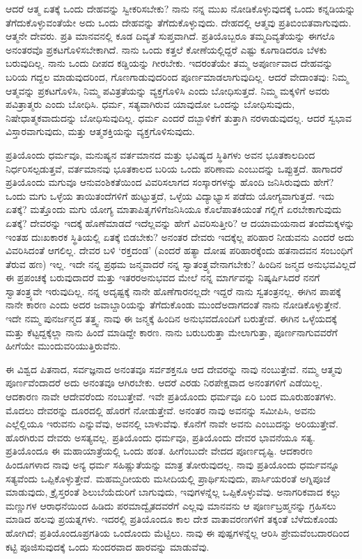 ಆದರೆ ಆತ್ಮ ಏತಕ್ಕೆ ಒಂದು ದೇಹವನ್ನು ಸ್ವೀಕರಿಸಬೇಕು? ನಾನು ನನ್ನ ಮುಖ ನೋಡಿಕೊಳ್ಳುವುದಕ್ಕೆ ಒಂದು ಕನ್ನಡಿಯನ್ನು ತೆಗೆದುಕೊಳ್ಳುವಂತೆಯೇ ಅದು ಒಂದು ದೇಹವನ್ನು ತೆಗೆದುಕೊಳ್ಳುವುದು. ದೇಹದಲ್ಲಿ ಆತ್ಮವು ಪ್ರತಿಬಿಂಬಿತವಾಗುವುದು. ಆತ್ಮನೇ ದೇವರು. ಪ್ರತಿ ಮಾನವನಲ್ಲಿ ಕೂಡ ದಿವ್ಯತೆ ಸುಪ್ತವಾಗಿದೆ. ಪ್ರತಿಯೊಬ್ಬರೂ ತಮ್ಮ\break ದಿವ್ಯತೆಯನ್ನು ಈಗಲೊ ಅನಂತರವೊ ಪ್ರಕಟಗೊಳಿಸಬೇಕಾಗಿದೆ. ನಾನು ಒಂದು ಕತ್ತಲೆ ಕೋಣೆಯಲ್ಲಿದ್ದರೆ ಎಷ್ಟು ಕೂಗಾಡಿದರೂ ಬೆಳಕು ಬರುವುದಿಲ್ಲ. ನಾನು ಒಂದು ದೀಪದ ಕಡ್ಡಿಯನ್ನು ಗೀರಬೇಕು. ಇದರಂತೆಯೇ ತಮ್ಮ ಅಪೂರ್ಣವಾದ ದೇಹವನ್ನು ಬರಿಯ ಗದ್ದಲ ಮಾಡುವುದರಿಂದ, ಗೊಣಗಾಡುವುದರಿಂದ ಪೂರ್ಣಮಾಡಲಾಗುವುದಿಲ್ಲ. ಆದರೆ ವೇದಾಂತವು: ನಿಮ್ಮ ಆತ್ಮವನ್ನು ಪ್ರಕಟಗೊಳಿಸಿ, ನಿಮ್ಮ ಪವಿತ್ರತೆಯನ್ನು ವ್ಯಕ್ತಗೊಳಿಸಿ ಎಂದು ಬೋಧಿಸುತ್ತದೆ. ನಿಮ್ಮ ಮಕ್ಕಳಿಗೆ ಅವರು ಪವಿತ್ರಾತ್ಮರು ಎಂದು ಬೋಧಿಸಿ. ಧರ್ಮ, ಸತ್ಯವಾಗಿರುವ ಯಾವುದೋ ಒಂದನ್ನು ಬೋಧಿಸುವುದು, ನಿಷೇಧಾತ್ಮಕವಾದುದನ್ನು ಬೋಧಿಸುವುದಿಲ್ಲ. ಧರ್ಮ ಎಂದರೆ ದಬ್ಬಾಳಿಕೆಗೆ ತುತ್ತಾಗಿ ನರಳಾಡುವುದಲ್ಲ. ಆದರೆ ಸ್ವಭಾವ ವಿಸ್ತಾರವಾಗುವುದು, ಮತ್ತು ಆತ್ಮಶಕ್ತಿಯನ್ನು ವ್ಯಕ್ತಗೊಳಿಸುವುದು.

ಪ್ರತಿಯೊಂದು ಧರ್ಮವೂ, ಮನುಷ್ಯನ ವರ್ತಮಾನದ ಮತ್ತು ಭವಿಷ್ಯದ ಸ್ಥಿತಿಗಳು ಅವನ ಭೂತಕಾಲದಿಂದ ನಿರ್ಧರಿಸಲ್ಪಡುತ್ತವೆ, ವರ್ತಮಾನವು ಭೂತಕಾಲದ ಬರಿಯ ಒಂದು ಪರಿಣಾಮ ಎಂಬುದನ್ನು ಒಪ್ಪುತ್ತದೆ. ಹಾಗಾದರೆ ಪ್ರತಿಯೊಂದು ಮಗುವೂ ಆನುವಂಶಿಕತೆಯಿಂದ ವಿವರಿಸಲಾಗದ ಸಂಸ್ಕಾರಗಳನ್ನು ಹೊಂದಿ ಜನಿಸಿರುವುದು ಹೇಗೆ? ಒಂದು ಮಗು ಒಳ್ಳೆಯ ತಾಯಿತಂದೆಗಳಿಗೆ ಹುಟ್ಟುತ್ತದೆ, ಒಳ್ಳೆಯ ವಿದ್ಯಾಭ್ಯಾಸ ಪಡೆದು ಯೋಗ್ಯವಾಗುತ್ತದೆ. ಇದು ಏತಕ್ಕೆ? ಮತ್ತೊಂದು ಮಗು ಯೋಗ್ಯ ಮಾತಾಪಿತೃಗಳಿಗೆ\break ಜನಿಸಿಯೂ ಕೊಲೆಪಾತಕಿಯಂತೆ ಗಲ್ಲಿಗೆ ಏರಬೇಕಾಗುವುದು ಏತಕ್ಕೆ? ದೇವರನ್ನು ಇದಕ್ಕೆ ಹೊಣೆಮಾಡದೆ ಇದೆಲ್ಲವನ್ನು ಹೇಗೆ ವಿವರಿಸುತ್ತೀರಿ? ಆ ದಯಾಮಯನಾದ ತಂದೆ\break ಮಕ್ಕಳನ್ನು ಇಂತಹ ದುಃಖಕಾರಕ ಸ್ಥಿತಿಯಲ್ಲಿ ಏತಕ್ಕೆ ಬಿಡಬೇಕು? ಅನಂತರ ದೇವರು ಇದಕ್ಕೆಲ್ಲ ಪರಿಹಾರ ನೀಡುವನು ಎಂದರೆ ಅದು ವಿವರಿಸಿದಂತೆ ಆಗಲಿಲ್ಲ. ದೇವರ ಬಳಿ ‘ರಕ್ತದಂಡ’ (ಎಂದರೆ ಹತ್ಯಾ ದೋಷ ಪರಿಹಾರಕ್ಕೆಂದು ಹತನಾದವನ ಸಂಬಂಧಿಗೆ ತೆರುವ ಹಣ) ಇಲ್ಲ. ಇದೇ ನನ್ನ ಪ್ರಥಮ ಜನ್ಮವಾದರೆ ನನ್ನ ಸ್ವಾತಂತ್ರ್ಯವೇನಾಗಬೇಕು? ಹಿಂದಿನ ಜನ್ಮದ ಅನುಭವವಿಲ್ಲದೆ ಈ ಪ್ರಪಂಚಕ್ಕೆ ಬರುವುದಾದರೆ ಮತ್ತು ಇತರರ\break ಅನುಭವದ ಮೇಲೆ ನನ್ನ ಮಾರ್ಗವನ್ನು ನಿಷ್ಕರ್ಷಿಸಿದರೆ ನನಗೆ ಸ್ವಾತಂತ್ರ್ಯವೇ ಇರುವುದಿಲ್ಲ. ನನ್ನ ಅದೃಷ್ಟಕ್ಕೆ ನಾನೇ ಹೊಣೆಗಾರನಲ್ಲದೇ ಇದ್ದರೆ ನಾನು ಸ್ವತಂತ್ರನಲ್ಲ. ಈಗಿನ ಪಾಪಕ್ಕೆ ನಾನೇ ಕಾರಣ ಎಂದು ಅದರ ಜವಾಬ್ದಾರಿಯನ್ನು ತೆಗೆದುಕೊಂಡು ಮುಂದೆ\break ಅದಾಗದಂತೆ ನಾನು ನೋಡಿಕೊಳ್ಳುತ್ತೇನೆ. ಇದೇ ನಮ್ಮ ಪುನರ್ಜನ್ಮದ ತತ್ತ್ವ. ನಾವು ಈ ಜನ್ಮಕ್ಕೆ ಹಿಂದಿನ ಅನುಭವದೊಂದಿಗೆ ಬರುತ್ತೇವೆ. ಈಗಿನ ಒಳ್ಳೆಯದಕ್ಕೆ ಮತ್ತು ಕೆಟ್ಟದ್ದಕ್ಕೆಲ್ಲಾ ನಾನು ಹಿಂದೆ ಮಾಡಿದ್ದೇ ಕಾರಣ. ನಾನು ಬರುಬರುತ್ತಾ ಮೇಲಾಗುತ್ತಾ, ಪೂರ್ಣನಾಗುವವರೆಗೆ ಹೀಗೆಯೇ ಮುಂದುವರಿಯುತ್ತಿರುವೆನು.

ಈ ವಿಶ್ವದ ಪಿತನಾದ, ಸರ್ವಜ್ಞನಾದ ಅನಂತವೂ ಸರ್ವಶಕ್ತನೂ ಆದ ದೇವರನ್ನು ನಾವು ನಂಬುತ್ತೇವೆ. ನಮ್ಮ ಆತ್ಮವು ಪೂರ್ಣವೆಂದಾದರೆ ಅದು ಅನಂತವೂ ಆಗಿರಬೇಕು. ಆದರೆ ಎರಡು ನಿರಪೇಕ್ಷವಾದ ಅನಂತಗಳಿಗೆ ಎಡೆಯಿಲ್ಲ. ಆದಕಾರಣ ನಾವೇ ಆ\break ದೇವರೆಂದು ನಂಬುತ್ತೇವೆ. ಇವೇ ಪ್ರತಿಯೊಂದು ಧರ್ಮವೂ ಏರಿ ಬಂದ ಮೂರು\break ಹಂತಗಳು. ಮೊದಲು ದೇವರನ್ನು ದೂರದಲ್ಲಿ ಹೊರಗೆ ನೋಡುತ್ತೇವೆ. ಅನಂತರ ನಾವು ಅವನನ್ನು ಸಮೀಪಿಸಿ, ಅವನು ಎಲ್ಲೆಲ್ಲಿಯೂ ಇರುವನು ಎನ್ನುವೆವು, ಅವನಲ್ಲಿ ಬಾಳುವೆವು. ಕೊನೆಗೆ ನಾವೇ ಅವನು ಎಂಬುದನ್ನು ಅರಿಯುತ್ತೇವೆ. ಹೊರಗಿರುವ ದೇವರು ಅಸತ್ಯವಲ್ಲ. ಪ್ರತಿಯೊಂದು ಧರ್ಮವೂ, ಪ್ರತಿಯೊಂದು ದೇವರ ಭಾವನೆಯೂ ಸತ್ಯ. ಪ್ರತಿಯೊಂದೂ ಈ ಮಹಾಯಾತ್ರೆಯಲ್ಲಿ ಒಂದು ಹಂತ. ಹೀಗೆಂಬುದೇ ವೇದದ ಪೂರ್ಣದೃಷ್ಟಿ. ಆದಕಾರಣ ಹಿಂದೂಗಳಾದ ನಾವು ಅನ್ಯ ಧರ್ಮ ಸಹಿಷ್ಣುತೆಯನ್ನು ಮಾತ್ರ ತೋರುವುದಲ್ಲ. ನಾವು ಪ್ರತಿಯೊಂದು ಧರ್ಮವನ್ನೂ ಸತ್ಯವೆಂದು ಒಪ್ಪಿಕೊಳ್ಳುತ್ತೇವೆ. ಮಹಮ್ಮದೀಯರು ಮಸೀದಿಯಲ್ಲಿ ಪ್ರಾರ್ಥಿಸುವುದು, ಪಾರ್ಸಿಯರಂತೆ ಅಗ್ನಿಪೂಜೆ ಮಾಡುವುದು, ಕ್ರೈಸ್ತರಂತೆ ಶಿಲುಬೆಯೆದುರಿಗೆ ಬಾಗುವುದು, ಇವುಗಳನ್ನೆಲ್ಲ ಒಪ್ಪಿಕೊಳ್ಳುವೆವು. ಅನಾಗರಿಕವಾದ ಕಲ್ಲು ಮಣ್ಣುಗಳ ಆರಾಧನೆಯಿಂದ ಹಿಡಿದು ಪರಮಾದ್ವೈತದವರೆಗೆ ಎಲ್ಲವು ಮಾನವನು ಆ ಪೂರ್ಣಬ್ರಹ್ಮನನ್ನು ಗ್ರಹಿಸಲು ಮಾಡಿದ ಹಲವು ಪ್ರಯತ್ನಗಳು. ಇದರಲ್ಲಿ ಪ್ರತಿಯೊಂದೂ ಕಾಲ ದೇಶ ವಾತಾವರಣಗಳಿಗೆ ತಕ್ಕಂತೆ ಬೆಳೆದುಕೊಂಡು ಹೋಗಿದೆ; ಪ್ರತಿಯೊಂದೂ\break ಪ್ರಗತಿಯ ಒಂದೊಂದು ಮೆಟ್ಟಿಲು. ನಾವು ಈ ಪುಷ್ಪಗಳನ್ನೆಲ್ಲ ಆರಿಸಿ ಪ್ರೇಮವೆಂಬ\break ದಾರದಿಂದ ಕಟ್ಟಿ ಪೂಜಿಸುವುದಕ್ಕೆ ಒಂದು ಸುಂದರವಾದ ಹಾರವನ್ನು ಮಾಡುವೆವು.


